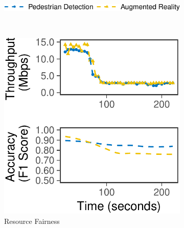 \begin{figure}
  \centering
  \begin{subfigure}[t]{0.6\columnwidth}
    \centering
    \includegraphics[width=\textwidth]{figures/multitask-legend.pdf}
  \end{subfigure}
  \\\vspace{0.4em}
  \begin{subfigure}[t]{0.45\columnwidth}
    \centering
    \includegraphics[width=\textwidth]{figures/multitask-left.pdf}
    \caption{Resource Fairness}
    \label{fig:eq-bw}
  \end{subfigure}
  \hfill
  \begin{subfigure}[t]{0.45\columnwidth}
    \centering

\end{subfigure}
\end{figure}
